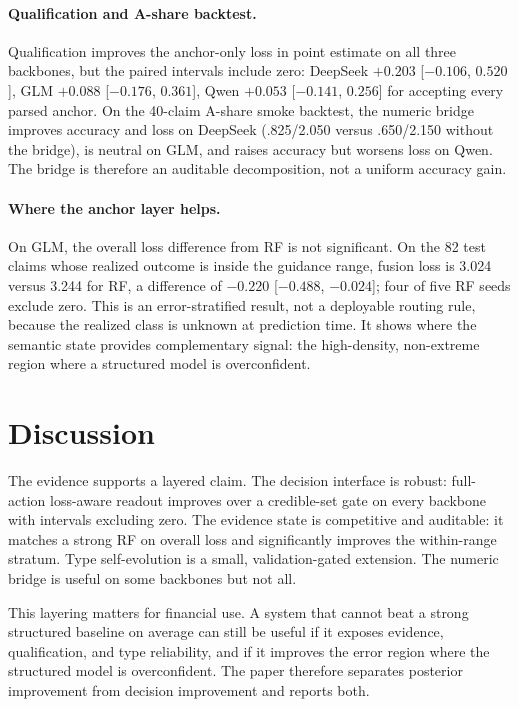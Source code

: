 \documentclass[11pt]{article}
\begin{document}
\paragraph{Qualification and A-share backtest.}
Qualification improves the anchor-only loss in point estimate on all three backbones, but the paired intervals include zero: DeepSeek $+0.203$ [$-0.106$, $0.520$], GLM $+0.088$ [$-0.176$, $0.361$], Qwen $+0.053$ [$-0.141$, $0.256$] for accepting every parsed anchor. On the 40-claim A-share smoke backtest, the numeric bridge improves accuracy and loss on DeepSeek (.825/2.050 versus .650/2.150 without the bridge), is neutral on GLM, and raises accuracy but worsens loss on Qwen. The bridge is therefore an auditable decomposition, not a uniform accuracy gain.

\paragraph{Where the anchor layer helps.}
On GLM, the overall loss difference from RF is not significant. On the 82 test claims whose realized outcome is inside the guidance range, fusion loss is 3.024 versus 3.244 for RF, a difference of $-0.220$ [$-0.488$, $-0.024$]; four of five RF seeds exclude zero. This is an error-stratified result, not a deployable routing rule, because the realized class is unknown at prediction time. It shows where the semantic state provides complementary signal: the high-density, non-extreme region where a structured model is overconfident.

\section{Discussion}

The evidence supports a layered claim. The decision interface is robust: full-action loss-aware readout improves over a credible-set gate on every backbone with intervals excluding zero. The evidence state is competitive and auditable: it matches a strong RF on overall loss and significantly improves the within-range stratum. Type self-evolution is a small, validation-gated extension. The numeric bridge is useful on some backbones but not all.

This layering matters for financial use. A system that cannot beat a strong structured baseline on average can still be useful if it exposes evidence, qualification, and type reliability, and if it improves the error region where the structured model is overconfident. The paper therefore separates posterior improvement from decision improvement and reports both.
\end{document}
